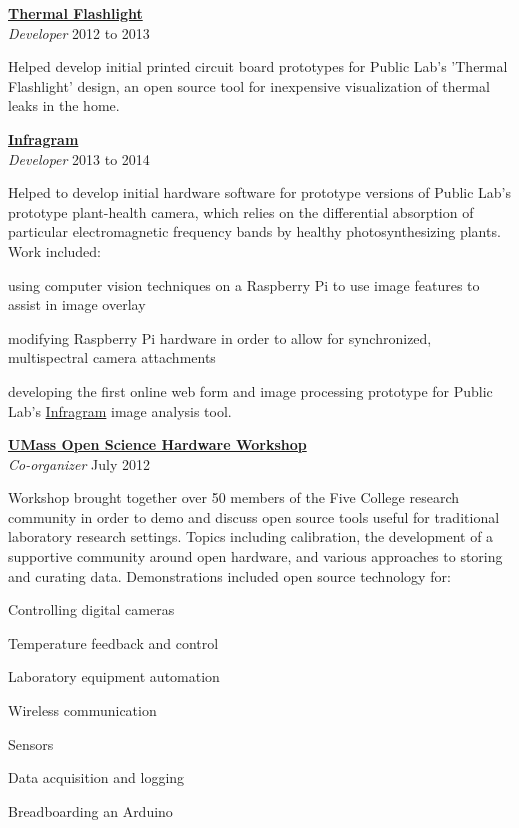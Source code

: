 \documentclass[10pt]{article}
\newcommand{\blankline}{\quad\pagebreak[3]}
\newcommand{\halfblankline}{\quad\vspace{-0.5\baselineskip}\pagebreak[3]}
\begin{document}
\blankline

\href{http://publiclab.org/wiki/thermal-flashlight}{\textbf{Thermal Flashlight}}\\
\emph{Developer} \hfill {2012 to 2013}

\halfblankline

Helped develop initial printed circuit board prototypes for Public Lab's 'Thermal Flashlight' design, an open source tool for inexpensive visualization of thermal leaks in the home. 

\blankline



\href{http://infragram.org}{\textbf{Infragram}}\\
\emph{Developer} \hfill {2013 to 2014}

\halfblankline

Helped to develop initial hardware software for prototype versions of  Public Lab's prototype plant-health camera, which relies on the differential absorption of particular electromagnetic frequency bands by healthy photosynthesizing plants.  Work included:
 \begin{innerlist}
\item using computer vision techniques on a Raspberry Pi to use image features to assist in image overlay
\item modifying Raspberry Pi hardware in order to allow for synchronized, multispectral camera attachments 
\item developing the first online web form and image processing prototype for Public Lab's \href{http://infragram.org}{Infragram} image analysis tool.
\end{innerlist}

\blankline

\href{https://github.com/dwblair/UMass-Open-Science-Hardware/wiki/Workshop-Summary}{\textbf{UMass Open Science Hardware Workshop}} \\
\emph{Co-organizer} \hfill {July 2012} 

\halfblankline

Workshop brought together over 50 members of the Five College research community in order to demo and discuss open source tools useful for traditional laboratory research settings. Topics including calibration, the development of a supportive community around open hardware, and various approaches to storing and curating data.
Demonstrations included open source technology for:
    \begin{innerlist}
        \item Controlling digital cameras
        \item Temperature feedback and control
        \item Laboratory equipment automation
\item Wireless communication 
\item Sensors
\item Data acquisition and logging
\item Breadboarding an Arduino
\end{innerlist}
\end{document}
